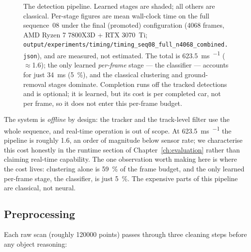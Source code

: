 \begin{figure}[H]
  \caption{The detection pipeline. Learned stages are shaded; all others are
    classical. Per-stage figures are mean wall-clock time on the full
    sequence~08 under the final (promoted) configuration
    (\num{4068} frames, AMD Ryzen 7 7800X3D + RTX 3070~Ti;
    \texttt{output/experiments/timing/timing\_seq08\_full\_n4068\_combined.json}), and are
    measured, not estimated. The total is
    \SI{623.5}{\milli\second\per\frame} ($\approx$\SI{1.6}{\fps}); the only learned
    \emph{per-frame} stage --- the classifier --- accounts for just
    \SI{34}{\milli\second} (\SI{5}{\percent}), and the classical clustering and
    ground-removal stages dominate. Completion runs off the tracked detections and
    is optional; it is learned, but its cost is per completed car, not per frame, so
    it does not enter this per-frame budget.}
  \label{fig:pipeline}
\end{figure}

The system is \emph{offline} by design: the tracker and the track-level filter
use the whole sequence, and real-time operation is out of scope. At
\SI{623.5}{\milli\second\per\frame} the pipeline is roughly \SI{1.6}{\fps}, an order
of magnitude below sensor rate; we characterise this cost honestly in the runtime
section of Chapter~\ref{ch:evaluation} rather than claiming real-time capability. The one
observation worth making here is where the cost lives: clustering alone is
\SI{59}{\percent} of the frame budget, and the only learned per-frame stage, the
classifier, is just \SI{5}{\percent}. The expensive parts of this pipeline are
classical, not neural.

\subsection{Preprocessing}
\label{sec:pipeline-preprocess}

Each raw scan (roughly \num{120000} points) passes through three cleaning steps
before any object reasoning:


